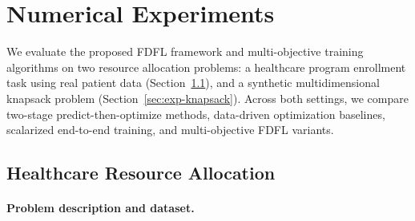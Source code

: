 \documentclass[ijoc,sglanonrev]{informs4}
\begin{document}

\section{Numerical Experiments} \label{sec:exp}

We evaluate the proposed FDFL framework and multi-objective training algorithms on two resource allocation problems: a healthcare program enrollment task using real patient data (Section~\ref{sec:exp-health}), and a synthetic multidimensional knapsack problem (Section~\ref{sec:exp-knapsack}). Across both settings, we compare two-stage predict-then-optimize methods, data-driven optimization baselines, scalarized end-to-end training, and multi-objective FDFL variants.

\subsection{Healthcare Resource Allocation} \label{sec:exp-health}

\paragraph{Problem description and dataset.}
\end{document}
